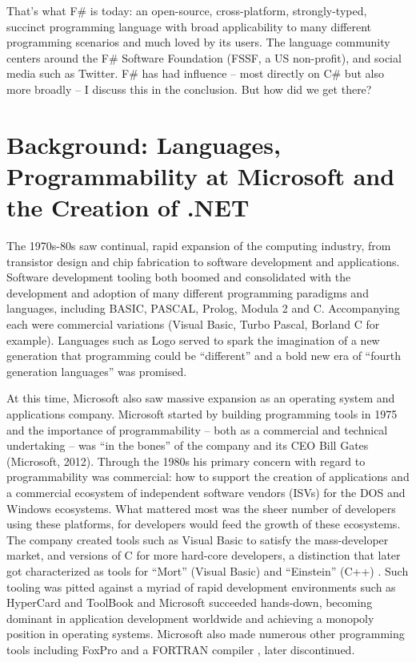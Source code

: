 \documentclass[acmsmall,review]{acmart}\settopmatter{printfolios=true,printccs=false,printacmref=false}
\begin{document}
That's what F\# is today: an open-source, cross-platform, strongly-typed, succinct programming language with broad applicability to many different programming scenarios and much loved by its users.  The language community centers around the F\# Software Foundation (FSSF, a US non-profit), and social media such as Twitter. F\# has had influence – most directly on C\# but also more broadly – I discuss this in the conclusion.  But how did we get there?

\section*{Background: Languages, Programmability at Microsoft and the Creation of .NET}

The 1970s-80s saw continual, rapid expansion of the computing industry, from transistor design and chip fabrication to software development and applications. Software development tooling both boomed and consolidated with the development and adoption of many different programming paradigms and languages, including BASIC, PASCAL, Prolog, Modula 2 and C.  Accompanying each were commercial variations (Visual Basic, Turbo Pascal, Borland C for example). Languages such as Logo served to spark the imagination of a new generation that programming could be “different”  and a bold new era of “fourth generation languages” was promised. 

At this time, Microsoft also saw massive expansion as an operating system and applications company.  Microsoft started by building programming tools in 1975 and the importance of programmability – both as a commercial and technical undertaking – was “in the bones” of the company and its CEO Bill Gates (Microsoft, 2012).  Through the 1980s his primary concern with regard to programmability was commercial: how to support the creation of applications and a commercial ecosystem of independent software vendors (ISVs) for the DOS and Windows ecosystems.  What mattered most was the sheer number of developers using these platforms, for developers would feed the growth of these ecosystems.  The company created tools such as Visual Basic to satisfy the mass-developer market, and versions of C for more hard-core developers, a distinction that later got characterized as tools for “Mort” (Visual Basic) and “Einstein” (C++) . Such tooling was pitted against a myriad of rapid development environments such as HyperCard  and ToolBook  and Microsoft succeeded hands-down, becoming dominant in application development worldwide and achieving a monopoly position in operating systems.  Microsoft also made numerous other programming tools including FoxPro  and a FORTRAN compiler , later discontinued.
\end{document}
